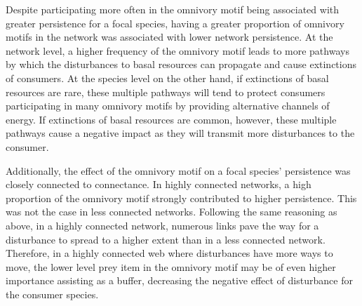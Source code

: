 \documentclass[12pt]{article}
\begin{document}
\begin{spacing}{2.0}
Despite participating more often in the omnivory motif being associated with greater persistence for a focal species, having a greater proportion of omnivory motifs in the network was associated with lower network persistence.
At the network level, a higher frequency of the omnivory motif leads to more pathways by which the disturbances to basal resources can propagate and cause extinctions of consumers.
At the species level on the other hand, if extinctions of basal resources are rare, these multiple pathways will tend to protect consumers participating in many omnivory motifs by providing alternative channels of energy.
If extinctions of basal resources are common, however, these multiple pathways cause a negative impact as they will transmit more disturbances to the consumer.

Additionally, the effect of the omnivory motif on a focal species' persistence was closely connected to connectance. In highly connected networks, a high proportion of the omnivory motif strongly contributed to higher persistence. This was not the case in less connected networks. 
Following the same reasoning as above, in a highly connected network, numerous links pave the way for a disturbance to spread to a higher extent than in a less connected network. 
Therefore, in a highly connected web where disturbances have more ways to move, the lower level prey item in the omnivory motif may be of even higher importance assisting as a buffer, decreasing the negative effect of disturbance for the consumer species.



\end{spacing}
\end{document}
